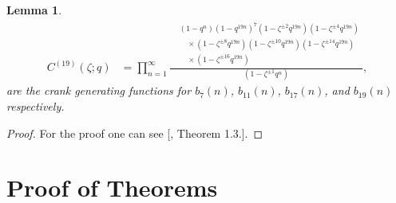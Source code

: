 \documentclass[12pt,oneside,reqno]{amsart}
\numberwithin{equation}{section}
\newtheorem{lemma}[theorem]{{\bf Lemma}}
\begin{document}
\begin{lemma}
	\begin{equation}\label{eq:C19}
		\begin{aligned}
			C^{(19)}(\zeta;q)
			&=
			\prod_{n=1}^{\infty}
			\frac{
				\begin{aligned}
					&(1-q^n)(1-q^{19n})^7
					(1-\zeta^{\pm2}q^{19n})
					(1-\zeta^{\pm4}q^{19n})\\
					&\quad{}\times
					(1-\zeta^{\pm8}q^{19n})
					(1-\zeta^{\pm10}q^{19n})
					(1-\zeta^{\pm14}q^{19n})\\
					&\quad{}\times
					(1-\zeta^{\pm16}q^{19n})
				\end{aligned}
			}{
				(1-\zeta^{\pm1}q^n)
			},
		\end{aligned}
	\end{equation}
	are the crank generating functions for $b_7(n)$, $b_{11}(n)$, $b_{17}(n)$, and $b_{19}(n)$ respectively.
\end{lemma}
\begin{proof}
	For the proof one can see [\cite{Wilson2026}, Theorem 1.3.].	
\end{proof}

	\section{Proof of Theorems}
\end{document}
